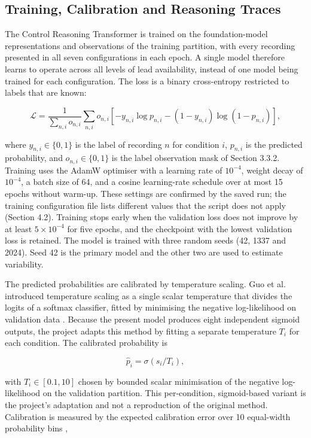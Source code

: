 \subsection{Training, Calibration and Reasoning Traces}
The Control Reasoning Transformer is trained on the foundation-model representations and observations of the training partition, with every recording presented in all seven configurations in each epoch. A single model therefore learns to operate across all levels of lead availability, instead of one model being trained for each configuration. The loss is a binary cross-entropy restricted to labels that are known:

\[
\mathcal{L} = \frac{1}{\sum_{n,i} o_{n,i}} \sum_{n,i} o_{n,i} \left[-y_{n,i}\log p_{n,i} - (1-y_{n,i})\log(1-p_{n,i})\right],
\]

where $y_{n,i} \in \{0,1\}$ is the label of recording $n$ for condition $i$, $p_{n,i}$ is the predicted probability, and $o_{n,i} \in \{0,1\}$ is the label observation mask of Section 3.3.2. Training uses the AdamW optimiser with a learning rate of $10^{-4}$, weight decay of $10^{-4}$, a batch size of 64, and a cosine learning-rate schedule over at most 15 epochs without warm-up. These settings are confirmed by the saved run; the training configuration file lists different values that the script does not apply (Section 4.2). Training stops early when the validation loss does not improve by at least $5 \times 10^{-4}$ for five epochs, and the checkpoint with the lowest validation loss is retained. The model is trained with three random seeds (42, 1337 and 2024). Seed 42 is the primary model and the other two are used to estimate variability.

The predicted probabilities are calibrated by temperature scaling. Guo et al. introduced temperature scaling as a single scalar temperature that divides the logits of a softmax classifier, fitted by minimising the negative log-likelihood on validation data \cite{GUO2017CALIBRATION}. Because the present model produces eight independent sigmoid outputs, the project adapts this method by fitting a separate temperature $T_i$ for each condition. The calibrated probability is

\[
\hat{p}_i = \sigma\!\left(s_i / T_i\right),
\]

with $T_i \in [0.1, 10]$ chosen by bounded scalar minimisation of the negative log-likelihood on the validation partition. This per-condition, sigmoid-based variant is the project's adaptation and not a reproduction of the original method. Calibration is measured by the expected calibration error over 10 equal-width probability bins \cite{GUO2017CALIBRATION},

